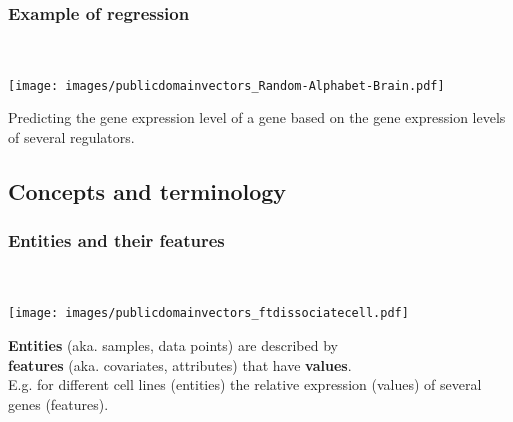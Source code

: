 \documentclass[aspectratio=169]{beamer}
\begin{document}
\begin{frame}
  \frametitle{Example of regression}
  \begin{block}{}
    \vspace{0.5cm}
    \ \ \ \
    \begin{minipage}{0.10\textwidth}
      \begin{center}
        \texttt{[image: images/publicdomainvectors\_Random-Alphabet-Brain.pdf]}
      \end{center}        
    \end{minipage}
    \hfill
    \begin{minipage}{0.80\textwidth}

     \begin{center}
       Predicting the gene expression level of a gene based on the
       gene expression levels of several regulators.
     \end{center}

    \end{minipage}
    \vspace{0.3cm}
  \end{block}
\end{frame}

\subsection{Concepts and terminology}

\begin{frame}{}
   \tableofcontents[currentsection]
\end{frame}

\begin{frame}
  \frametitle{Entities and their features}  
  \begin{block}{}
    \vspace{0.5cm}
    \ \ \ \
    \begin{minipage}{0.10\textwidth}
      \begin{center}
        \texttt{[image: images/publicdomainvectors\_ftdissociatecell.pdf]}
      \end{center}        
    \end{minipage}
    \hfill
    \begin{minipage}{0.80\textwidth}

      \textbf{Entities} (aka. samples, data points) are described by \\
      \textbf{features} (aka.  covariates, attributes) that have
      \textbf{values}.\\

      E.g. for different cell lines (entities) the relative expression
      (values) of several genes (features).
      
    \end{minipage}
    \vspace{0.3cm}
  \end{block}
\end{frame}
\end{document}

